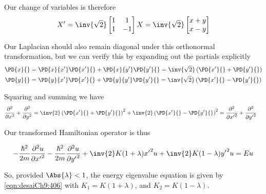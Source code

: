 Our change of variables is therefore
\begin{align}\label{eqn:desaiCh9:503}
X' = 
\inv{\sqrt{2}}
\begin{bmatrix}
1 & 1 \\
1 & -1
\end{bmatrix}
X
= 
\inv{\sqrt{2}}
\begin{bmatrix}
x + y \\
x - y
\end{bmatrix}
\end{align}

Our Laplacian should also remain diagonal under this orthonormal transformation, but we can verify this by expanding out the partials explicitly
\begin{align}\label{eqn:desaiCh9:504}
\PD{x}{} &= 
\PD{x}{x'}\PD{x'}{}
+\PD{x}{y'}\PD{y'}{} = \inv{\sqrt{2}} \left( \PD{x'}{} + \PD{y'}{} \right) \\
\PD{y}{} &= 
\PD{y}{x'}\PD{x'}{} +\PD{y}{y'}\PD{y'}{}
= \inv{\sqrt{2}} 
\left( \PD{x'}{} - \PD{y'}{} \right)
\end{align}

Squaring and summing we have
\begin{align}\label{eqn:desaiCh9:505}
\frac{\partial^2}{\partial x^2} +
\frac{\partial^2}{\partial y^2}
&=
\inv{2} \left( \PD{x'}{} + \PD{y'}{} \right)^2
+\inv{2} \left( \PD{x'}{} - \PD{y'}{} \right)^2
=
\frac{\partial^2}{\partial {x'}^2} +
\frac{\partial^2}{\partial {y'}^2}
\end{align}

Our transformed Hamiltonian operator is thus

\begin{align}\label{eqn:desaiCh9:506}
-\frac{\hbar^2}{2m} \frac{\partial^2 u}{\partial {x'}^2}
-\frac{\hbar^2}{2m} \frac{\partial^2 u}{\partial {y'}^2}
+ \inv{2} K(1+\lambda) {x'}^2 u
+ \inv{2} K(1-\lambda) {y'}^2 u
= E u
\end{align}

So, provided $\Abs{\lambda} < 1$, the energy eigenvalue equation is given by \ref{eqn:desaiCh9:406} with $K_1 = K(1+ \lambda)$, and $K_2 = K(1 -\lambda)$.

\EndArticle
